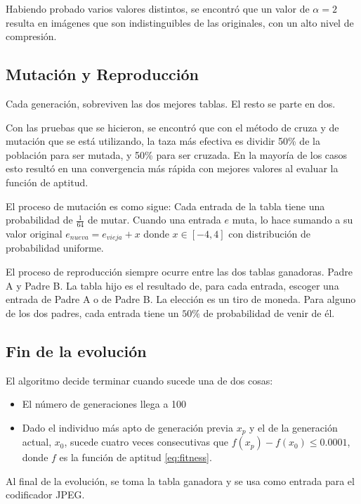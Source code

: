 Habiendo probado varios valores distintos, se encontró que un valor de $\alpha
= 2$ resulta en imágenes que son indistinguibles de las originales, con un alto
nivel de compresión.


\subsection {Mutación y Reproducción}

Cada generación, sobreviven las dos mejores tablas. El resto se parte en dos.

Con las pruebas que se hicieron, se encontró que con el método de cruza y de
mutación que se está utilizando, la taza más efectiva es dividir 50\% de la
población para ser mutada, y 50\% para ser cruzada. En la mayoría de los casos
esto resultó en una convergencia más rápida con mejores valores al evaluar la
función de aptitud.

El proceso de mutación es como sigue: Cada entrada de la tabla tiene una
probabilidad de $\frac{1}{64}$ de mutar. Cuando una entrada $e$ muta, lo hace
sumando a su valor original $e_{nueva} = e_{vieja} + x $ donde $x \in [-4, 4]$
con distribución de probabilidad uniforme.

El proceso de reproducción siempre ocurre entre las dos tablas ganadoras. Padre
A y Padre B.  La tabla hijo es el resultado de, para cada entrada, escoger una
entrada de Padre A o de Padre B. La elección es un tiro de moneda. Para alguno
de los dos padres, cada entrada tiene un $50\%$ de probabilidad de venir de él.

\subsection {Fin de la evolución}

El algoritmo decide terminar cuando sucede una de dos cosas:

\begin{itemize}
\item El número de generaciones llega a 100
\item Dado el individuo más apto de generación previa $x_p$ y el de la generación actual, $x_0$, sucede cuatro veces consecutivas que $f(x_p) - f(x_0) \leq 0.0001$, donde $f$ es la función de aptitud \ref{eq:fitness}.
\end{itemize}

Al final de la evolución, se toma la tabla ganadora y se usa como entrada para
el codificador \gls{JPEG}.

